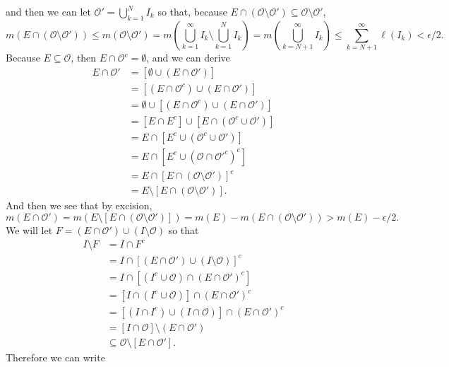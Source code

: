 \begin{enumerate}
    and then we can let $\mathcal{O}'=\bigcup_{k=1}^N I_k$ so that, because $E\cap(\mathcal{O}\setminus\mathcal{O}')\subseteq\mathcal{O}\setminus\mathcal{O}'$,
    \[
        m(E\cap(\mathcal{O}\setminus\mathcal{O}'))\le m(\mathcal{O}\setminus\mathcal{O}')=m(\bigcup_{k=1}^\infty I_k\setminus\bigcup_{k=1}^N I_k)=m(\bigcup_{k=N+1}^\infty I_k)\le\sum_{k=N+1}^\infty\ell(I_k)<\epsilon/2.
    \]
    Because $E\subseteq \mathcal{O}$, then $E\cap \mathcal{O}^c=\emptyset$, and we can derive
    \begin{align*}
        E\cap\mathcal{O}'&=[\emptyset\cup(E\cap\mathcal{O}')]\\
        &=[(E\cap\mathcal{O}^c)\cup(E\cap\mathcal{O}')]\\
        &=\emptyset\cup[(E\cap\mathcal{O}^c)\cup(E\cap\mathcal{O}')]\\
        &=[E\cap E^c]\cup[E\cap(\mathcal{O}^c\cup\mathcal{O}')]\\
        &=E\cap[E^c\cup(\mathcal{O}^c\cup\mathcal{O}')]\\
        &=E\cap[E^c\cup(\mathcal{O}\cap\mathcal{O}'^c)^c]\\
        &=E\cap[E\cap(\mathcal{O}\setminus\mathcal{O}')]^c\\
        &=E\setminus[E\cap(\mathcal{O}\setminus\mathcal{O}')].
    \end{align*}
    And then we see that by excision,
    \begin{equation}
        m(E\cap\mathcal{O}')=m(E\setminus[E\cap(\mathcal{O}\setminus\mathcal{O}')])=m(E)-m(E\cap(\mathcal{O}\setminus\mathcal{O}'))>m(E)-\epsilon/2.\tag{2}
    \end{equation}
    We will let $F=(E\cap\mathcal{O}')\cup(I\setminus\mathcal{O})$ so that 
    \begin{align*}
        I\setminus F&=I\cap F^c\\
        &=I\cap[(E\cap\mathcal{O}')\cup(I\setminus\mathcal{O})]^c\\
        &=I\cap[(I^c\cup\mathcal{O})\cap(E\cap\mathcal{O}')^c]\\
        &=[I\cap(I^c\cup\mathcal{O})]\cap(E\cap\mathcal{O}')^c\\
        &=[(I\cap I^c)\cup(I\cap\mathcal{O})]\cap(E\cap\mathcal{O}')^c\\
        &=[I\cap\mathcal{O}]\setminus(E\cap\mathcal{O}')\\
        &\subseteq\mathcal{O}\setminus[E\cap\mathcal{O}'].
    \end{align*}
    Therefore we can write
    \begin{align*}

\end{align*}
\end{enumerate}
